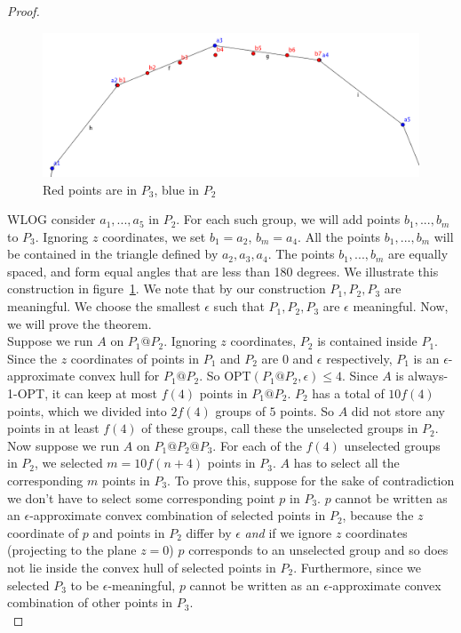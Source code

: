 \begin{proof}
\begin{figure}[!htb]
\centering
\includegraphics[width=0.6\linewidth]{layer3points}
\caption{Red points are in $P_3$, blue in $P_2$}
\label{fig:layer3}
\end{figure}

WLOG consider $a_1, ..., a_5$ in $P_2$. For each such group, we will add points $b_1, ..., b_m$ to $P_3$. Ignoring $z$ coordinates, we set $b_1 = a_2$, $b_m = a_4$. All the points $b_1, ..., b_m$ will be contained in the triangle defined by $a_2, a_3, a_4$. The points $b_1, ..., b_m$ are equally spaced, and form equal angles that are less than 180 degrees. We illustrate this construction in figure~\ref{fig:layer3}. We note that by our construction $P_1, P_2, P_3$ are meaningful. We choose the smallest $\epsilon$ such that $P_1, P_2, P_3$ are $\epsilon$ meaningful. Now, we will prove the theorem.
\\

Suppose we run $A$ on $P_1 @ P_2$. Ignoring $z$ coordinates, $P_2$ is contained inside $P_1$. Since the $z$ coordinates of points in $P_1$ and $P_2$ are $0$ and $\epsilon$ respectively, $P_1$ is an $\epsilon$-approximate convex hull for $P_1 @ P_2$. So OPT$(P_1 @ P_2, \epsilon) \leq 4$. Since $A$ is always-1-OPT, it can keep at most $f(4)$ points in $P_1 @ P_2$. $P_2$ has a total of $10f(4)$ points, which we divided into $2f(4)$ groups of $5$ points. So $A$ did not store any points in at least $f(4)$ of these groups, call these the unselected groups in $P_2$.
\\

Now suppose we run $A$ on $P_1 @ P_2 @ P_3$. For each of the $f(4)$ unselected groups in $P_2$, we selected $m = 10f(n+4)$ points in $P_3$. $A$ has to select all the corresponding $m$ points in $P_3$. To prove this, suppose for the sake of contradiction we don't have to select some corresponding point $p$ in $P_3$. $p$ cannot be written as an $\epsilon$-approximate convex combination of selected points in $P_2$, because the $z$ coordinate of $p$ and points in $P_2$ differ by $\epsilon$ \emph{and} if we ignore $z$ coordinates (projecting to the plane $z = 0$) $p$ corresponds to an unselected group and so does not lie inside the convex hull of selected points in $P_2$. Furthermore, since we selected $P_3$ to be $\epsilon$-meaningful, $p$ cannot be written as an $\epsilon$-approximate convex combination of other points in $P_3$.
\\


\end{proof}
